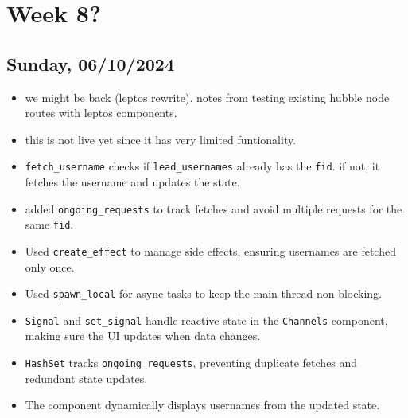 \newpage
\section{Week 8?}
\subsection*{Sunday, 06/10/2024}
\begin{itemize}
    \item we might be back (leptos rewrite). notes from testing existing hubble
        node routes with leptos components.
    \item this is not live yet since it has very limited funtionality.
    \item \texttt{fetch_username} checks if \texttt{lead_usernames} already 
        has the \texttt{fid}. if not, it fetches the username and updates the 
        state.
    \item added \texttt{ongoing_requests} to track fetches and avoid multiple 
        requests for the same \texttt{fid}.
    \item Used \texttt{create_effect} to manage side effects, ensuring 
        usernames are fetched only once.
    \item Used \texttt{spawn_local} for async tasks to keep the main thread 
        non-blocking.
    \item \texttt{Signal} and \texttt{set_signal} handle reactive state in the 
        \texttt{Channels} component, making sure the UI updates when data 
        changes.
    \item \texttt{HashSet} tracks \texttt{ongoing_requests}, preventing 
        duplicate fetches and redundant state updates.
    \item The component dynamically displays usernames from the updated state.
\end{itemize}
